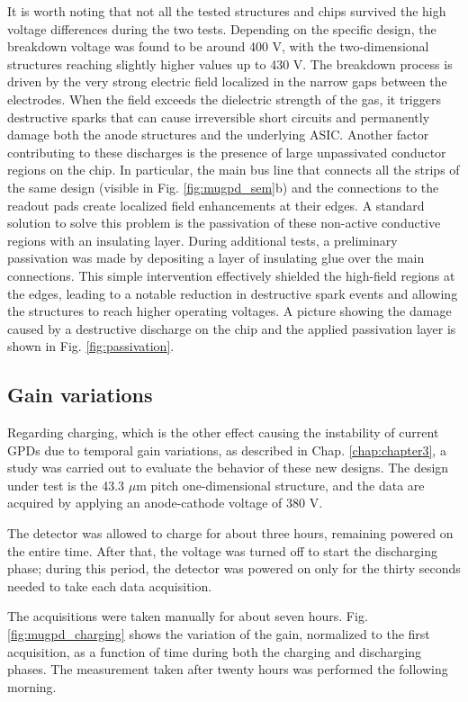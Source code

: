 It is worth noting that not all the tested structures and chips survived the high voltage differences during the two tests. Depending on the specific design, the breakdown voltage was found to be around 400 V, with the two-dimensional structures reaching slightly higher values up to 430 V. The breakdown process is driven by the very strong electric field localized in the narrow gaps between the electrodes. When the field exceeds the dielectric strength of the gas, it triggers destructive sparks that can cause irreversible short circuits and permanently damage both the anode structures and the underlying ASIC. Another factor contributing to these discharges is the presence of large unpassivated conductor regions on the chip. In particular, the main bus line that connects all the strips of the same design (visible in Fig. \ref{fig:mugpd_sem}b) and the connections to the readout pads create localized field enhancements at their edges. A standard solution to solve this problem is the passivation of these non-active conductive regions with an insulating layer. During additional tests, a preliminary passivation was made by depositing a layer of insulating glue over the main connections. This simple intervention effectively shielded the high-field regions at the edges, leading to a notable reduction in destructive spark events and allowing the structures to reach higher operating voltages. A picture showing the damage caused by a destructive discharge on the chip and the applied passivation layer is shown in Fig. \ref{fig:passivation}.


\subsection{Gain variations}

Regarding charging, which is the other effect causing the instability of current GPDs due to temporal gain variations, as described in Chap. \ref{chap:chapter3}, a study was carried out to evaluate the behavior of these new designs. The design under test is the 43.3 $\mu\text{m}$ pitch one-dimensional structure, and the data are acquired by applying an anode-cathode voltage of 380 V.

The detector was allowed to charge for about three hours, remaining powered on the entire time. After that, the voltage was turned off to start the discharging phase; during this period, the detector was powered on only for the thirty seconds needed to take each data acquisition.

The acquisitions were taken manually for about seven hours. Fig. \ref{fig:mugpd_charging} shows the variation of the gain, normalized to the first acquisition, as a function of time during both the charging and discharging phases. The measurement taken after twenty hours was performed the following morning.

